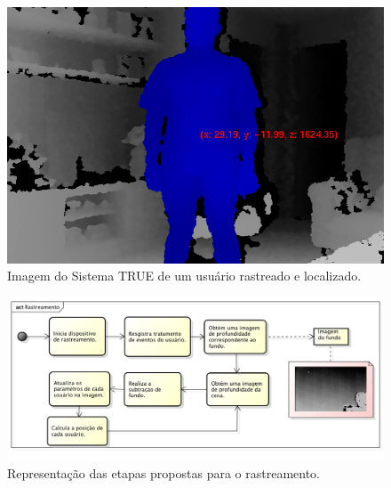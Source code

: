 	\begin{figure}[htb]
		\begin{center}
			\includegraphics[scale=0.45]{figuras/4.ProblemaEProposta/localizacao.png}
		\end{center}
		\caption{Imagem do Sistema TRUE de um usuário rastreado e localizado.}
		\label{fig:localizacao}
	\end{figure}
	
	
	\begin{figure}[htb]
		\begin{center}
			\includegraphics[scale=0.5]{figuras/4.ProblemaEProposta/diagrama-rastreamento.png}
		\end{center}
		\caption{Representação das etapas propostas para o rastreamento.}
		\label{fig:processo-rastreamento}
	\end{figure}
